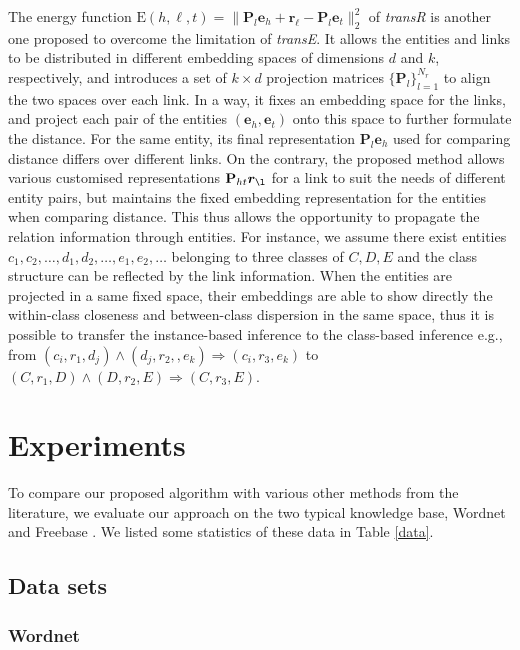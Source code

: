 \documentclass[9pt]{sig-alternate-05-2015}
\begin{document}
The energy function  $\mathrm{E}{(h,\ell, t)} = \|\textbf{P}_l\bm{e}_h + \bm{r}_{\ell}-\textbf{P}_l\bm{e}_t\|_2^2$ of \emph{transR} \cite{lin_learning_2015} is another one proposed to overcome the limitation of   \emph{transE}. It allows the entities and links to be distributed in different embedding spaces of dimensions $d$ and $k$, respectively, and  introduces a set of $ k\times d$ projection matrices $\{\textbf{P}_l\}_{l=1}^{N_r}$ to align the two spaces over each link. In a way, it fixes an embedding space for the links, and project each pair of the entities $(\bm{e}_h, \bm{e}_t)$ onto this space to further formulate the distance. For the same entity,  its final representation $\textbf{P}_l\bm{e}_h$ used for comparing distance  differs over different links. On the contrary, the proposed method allows various customised representations $\textbf{P}_{ht} \bm{r}_{\l}$ for a link to suit the needs of different entity pairs, but maintains the fixed embedding representation for the entities when comparing distance. This thus allows the opportunity to propagate the relation information through entities. For instance, we assume there exist entities $c_1,c_2, \ldots,d_1,d_2,\ldots, e_1, e_2, \ldots$ belonging to three classes of $C,D,E$ and the class structure can be reflected by the link information.   When the entities are projected in a same fixed space,  their embeddings are able to  show directly the within-class closeness and between-class dispersion in the same space, thus it is possible to  transfer the instance-based inference to the class-based inference e.g., from $(c_i, r_1, d_j) \wedge (d_j, r_2,, e_k) \Rightarrow  (c_i, r_3, e_k)$ to $(C, r_1, D)\wedge (D, r_2, E) \Rightarrow  (C, r_3, E)$.



\section{Experiments} \label{exp}
To compare our proposed algorithm with various other methods from the literature, we evaluate our approach on the two typical knowledge base, Wordnet \cite{miller_wordnet:_1995} and Freebase \cite{bollacker_freebase:_2008}. We listed some statistics of these data in Table \ref{data}.

\subsection{Data sets}
\subsubsection{Wordnet} 
\end{document}
